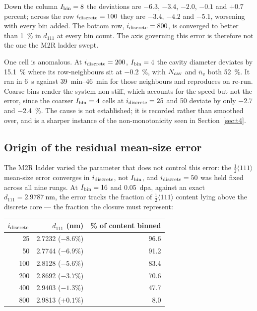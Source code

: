 \documentclass[11pt]{article}
\newcommand{\halfp}{$\tfrac{1}{2}\langle111\rangle$}
\begin{document}
Down the column $I_{\rm bin} = 8$ the deviations are $-6.3$, $-3.4$, $-2.0$,
$-0.1$ and $+0.7$ percent; across the row $i_{\rm discrete} = 100$ they are
$-3.4$, $-4.2$ and $-5.1$, worsening with every bin added. The bottom row,
$i_{\rm discrete} = 800$, is converged to better than \SI{1}{\percent} in
$d_{111}$ at every bin count. The axis governing this error is therefore not the
one the M2R ladder swept.

One cell is anomalous. At $i_{\rm discrete} = 200$, $I_{\rm bin} = 4$ the cavity
diameter deviates by \SI{+15.1}{\percent} where its row-neighbours sit at
\SI{-0.2}{\percent}, with $N_{\rm cav}$ and $\overline{n}_v$ both
\SI{+52}{\percent}. It ran in \SI{6}{\second} against
\SIrange{39}{46}{\minute} for those neighbours and reproduces on re-run. Coarse
bins render the system non-stiff, which accounts for the speed but not the
error, since the coarser $I_{\rm bin} = 4$ cells at $i_{\rm discrete} = 25$ and
50 deviate by only $-2.7$ and \SI{-2.4}{\percent}. The cause is not established;
it is recorded rather than smoothed over, and is a sharper instance of the
non-monotonicity seen in Section~\ref{sec:t4}.

\FloatBarrier
\subsection{Origin of the residual mean-size error}\label{sec:d111}

The M2R ladder varied the parameter that does not control this error: the
\halfp{} mean-size error converges in $i_{\rm discrete}$, not $I_{\rm bin}$, and
$i_{\rm discrete} = 50$ was held fixed across all nine rungs. At
$I_{\rm bin} = 16$ and \SI{0.05}{dpa}, against an exact
$d_{111} = \SI{2.9787}{\nano\metre}$, the error tracks the fraction of \halfp{}
content lying above the discrete core --- the fraction the closure must
represent:

\begin{center}
\begin{tabular}{rrr}
\toprule
$i_{\rm discrete}$ & $d_{111}$ (\si{\nano\metre}) & \% of content binned \\
\midrule
25  & 2.7232 \quad($-8.6\%$) & 96.6 \\
50  & 2.7744 \quad($-6.9\%$) & 91.2 \\
100 & 2.8128 \quad($-5.6\%$) & 83.4 \\
200 & 2.8692 \quad($-3.7\%$) & 70.6 \\
400 & 2.9403 \quad($-1.3\%$) & 47.7 \\
800 & 2.9813 \quad($+0.1\%$) & \phantom{0}8.0 \\
\bottomrule
\end{tabular}
\end{center}
\end{document}
